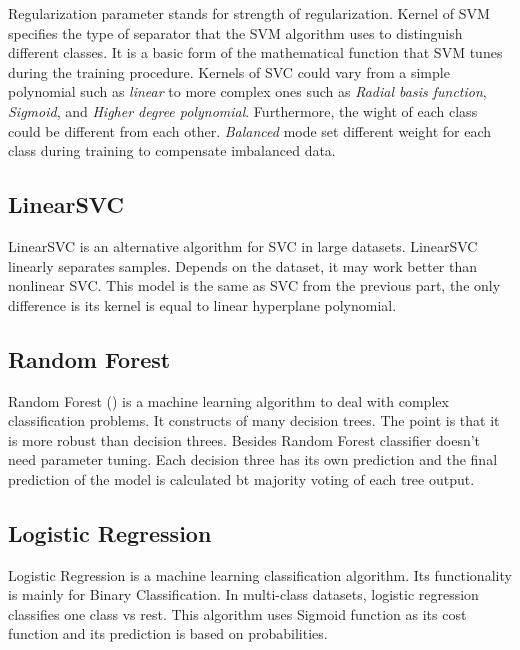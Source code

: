 Regularization parameter stands for strength of regularization. Kernel of SVM specifies the type of separator that the SVM algorithm uses to distinguish different classes. It is a basic form of the mathematical function that SVM tunes during the training procedure. Kernels of SVC could vary from a simple polynomial such as \textit{linear} to more complex ones such as \textit{Radial basis function}, \textit{Sigmoid}, and \textit{Higher degree polynomial}. Furthermore, the wight of each class could be different from each other. \textit{Balanced} mode set different weight for each class during training to compensate imbalanced data. 


\subsection{LinearSVC}
LinearSVC is an alternative algorithm for SVC in large datasets. LinearSVC linearly separates samples. Depends on the dataset, it may work better than nonlinear SVC. This model is the same as SVC from the previous part, the only difference is its kernel is equal to linear hyperplane polynomial. 

\subsection{Random Forest}
Random Forest (\cite{randomforest}) is a machine learning algorithm to deal with complex classification problems. It constructs of many decision trees. The point is that it is more robust than decision threes. Besides Random Forest classifier doesn't need parameter tuning. Each decision three has its own prediction and the final prediction of the model is calculated bt majority voting of each tree output. 

\subsection{Logistic Regression}
Logistic Regression is a machine learning classification algorithm. Its functionality is mainly for Binary Classification. In multi-class datasets, logistic regression classifies one class vs rest. This algorithm uses Sigmoid function as its cost function and its prediction is based on probabilities. 

